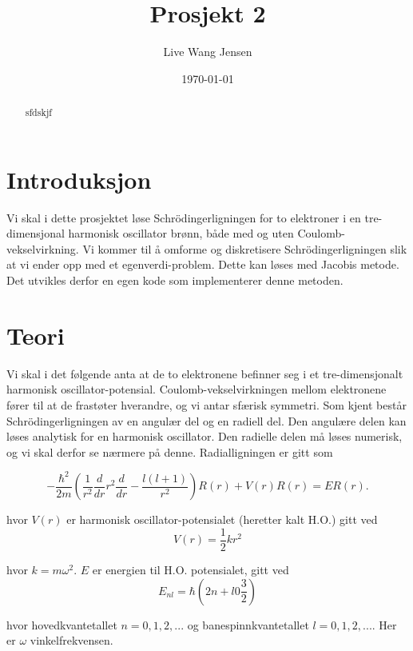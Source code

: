 \documentclass{article}
\title{Prosjekt 2}
\author{Live Wang Jensen}
\date{\today}
\begin{document}
\maketitle

\begin{abstract}
sfdskjf

\end{abstract}

\section{Introduksjon}
Vi skal i dette prosjektet løse Schrödingerligningen for to elektroner i en tre-dimensjonal harmonisk oscillator brønn, både med og uten Coulomb-vekselvirkning. Vi kommer til å omforme og diskretisere Schrödingerligningen slik at vi ender opp med et egenverdi-problem. Dette kan løses med Jacobis metode. Det utvikles derfor en egen kode som implementerer denne metoden.

\section{Teori}
Vi skal i det følgende anta at de to elektronene befinner seg i et tre-dimensjonalt harmonisk oscillator-potensial. Coulomb-vekselvirkningen mellom elektronene fører til at de frastøter hverandre, og vi antar sfærisk symmetri. Som kjent består Schrödingerligningen av en angulær del og en radiell del. Den angulære delen kan løses analytisk for en harmonisk oscillator. Den radielle delen må løses numerisk, og vi skal derfor se nærmere på denne. Radialligningen er gitt som 

\begin{equation}
  -\frac{\hbar^2}{2 m} \left ( \frac{1}{r^2} \frac{d}{dr} r^2
  \frac{d}{dr} - \frac{l (l + 1)}{r^2} \right )R(r) 
     + V(r) R(r) = E R(r).
\end{equation}

hvor $V(r)$ er harmonisk oscillator-potensialet (heretter kalt H.O.) gitt ved
\begin{equation}
V(r) = \frac{1}{2}kr^2
\end{equation}

hvor $k = m\omega^2$. $E$ er energien til H.O. potensialet, gitt ved
\begin{equation}
E_{nl} = \hbar\left(2n + l 0 \frac{3}{2} \right)
\end{equation}

hvor hovedkvantetallet $n = 0,1,2,...$ og banespinnkvantetallet $l = 0,1,2,...$. Her er $\omega$ vinkelfrekvensen.\\
\end{document}

